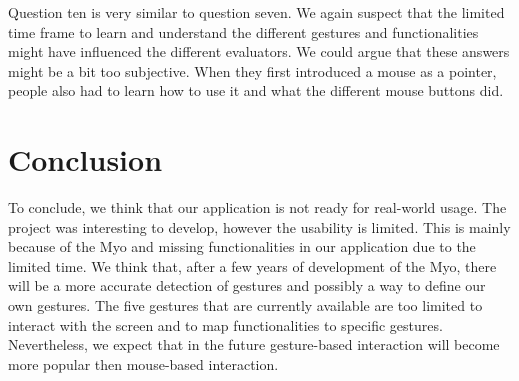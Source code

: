 \documentclass{article}
\begin{document}
Question ten is very similar to question seven. We again suspect that the limited time frame to learn and understand the different gestures and functionalities might have influenced the different evaluators. We could argue that these answers might be a bit too subjective. When they first introduced a mouse as a pointer, people also had to learn how to use it and what the different mouse buttons did.

\section{Conclusion}
To conclude, we think that our application is not ready for real-world usage. The project was interesting to develop, however the usability is limited. This is mainly because of the Myo and missing functionalities in our application due to the limited time. We think that, after a few years of development of the Myo, there will be a more accurate detection of gestures and possibly a way to define our own gestures. The five gestures that are currently available are too limited to interact with the screen and to map functionalities to specific gestures. Nevertheless, we expect that in the future gesture-based interaction will become more popular then mouse-based interaction.
\end{document}

